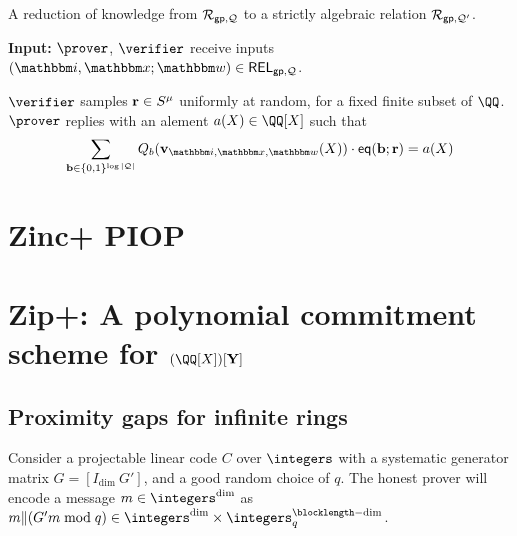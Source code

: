\documentclass[11pt,letterpaper,usenames,dvipsnames]{article}
\begin{document}
     	\begin{algorithm}[H]
		\caption{A 
        reduction of knowledge from $\mathcal{R}_{\mathsf{gp}, \mathcal{Q}}$ to a strictly algebraic relation $\mathcal{R}_{\mathsf{gp}, \mathcal{Q}'}$. \label{a: red_to_strictly_algebraic}}
		\textbf{Input:} $\Prover$, $\verifier$ receive inputs $(\idx, \inp; \wit)\in \REL_{\gp, \cQ}$. %
		\begin{algorithmic}[1]
            \STATE $\verifier$ samples $\mathbf{r}\in S^\mu$ uniformly at random, for a fixed finite subset of $\QQ$. 
            \STATE $\prover$ replies with an alement $a(X)\in \QQ[X]$ such that
            $$
            \sum_{\bb\in \{0,1\}^{\log|\cQ|}} Q_b(\vv_{\idx,\inp,\wit}(X))\cdot \eq(\bb; \rr) = a(X)
            $$
            \STATE 
		\end{algorithmic}
	\end{algorithm}




\section{Zinc+ PIOP}





\section{Zip+: A polynomial commitment scheme for $(\QQ[X])[\vec Y]$}

	

\subsection{Proximity gaps for infinite rings}
\label{sec:proximity-gap}

Consider a projectable linear code $C$ over $\integers$ with a systematic generator matrix $G = [I_{\dim} \ G']$, and a good random choice of $q$. The honest prover will encode a message $m \in \integers^{\dim}$ as $m \| (G'm \bmod q) \in \integers^{\dim} \times \integers_{q}^{\blocklength-\dim}$.
\end{document}
